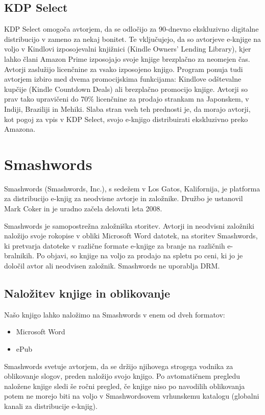 \documentclass[a4paper, 12pt]{book}
\begin{document}
\subsection{KDP Select}
KDP Select omogoča avtorjem, da se odločijo za 90-dnevno ekskluzivno digitalne distribucijo  v zameno za nekaj bonitet. Te vključujejo, da so avtorjeve e-knjige na voljo v Kindlovi izposojevalni knjižnici (Kindle Owners’ Lending Library), kjer lahko člani Amazon Prime izposojajo svoje knjige brezplačno za neomejen čas. Avtorji zaslužijo licenčnine za vsako izposojeno knjigo. Program ponuja tudi avtorjem izbiro med dvema promocijskima funkcijama: Kindlove odštevalne kupčije (Kindle Countdown Deals) ali brezplačno promocijo knjige. Avtorji so prav tako upravičeni do 70\% licenčnine za prodajo strankam na Japonskem, v Indiji, Braziliji in Mehiki. Slaba stran  vseh teh prednosti je, da morajo avtorji, kot pogoj za vpis v KDP Select, svojo e-knjigo distribuirati ekskluzivno preko Amazona.

\section{Smashwords}
Smashwords (Smashwords, Inc.), s sedežem v Los Gatos, Kalifornija, je platforma za distribucijo e-knjig za neodvisne avtorje in založnike. Družbo je ustanovil Mark Coker in je uradno začela delovati leta 2008. \cite{46}

Smashwords je samopostrežna založniška storitev. Avtorji in neodvisni založniki naložijo svoje rokopise v obliki Microsoft Word datotek, na storitev Smashwords, ki pretvarja datoteke v različne formate e-knjige za branje na različnih e-bralnikih. Po objavi, so knjige na voljo za prodajo na spletu po ceni, ki jo je določil avtor ali neodvisen založnik. Smashwords ne uporablja DRM.

\subsection{Naložitev knjige in oblikovanje}
Našo knjigo lahko naložimo na Smashwords v enem od dveh formatov:
\begin{itemize}
	\item Microsoft Word
	\item ePub
\end{itemize}

Smashwords svetuje avtorjem, da se držijo njihovega strogega vodnika za oblikovanje slogov, preden naložijo svojo knjigo. Po avtomatičnem pregledu naložene knjige sledi še ročni pregled, če knjige niso po navodilih oblikovanja potem ne morejo biti na voljo v Smashwordsovem vrhunskemu katalogu (globalni kanali za distribucije e-knjig).
\end{document}
